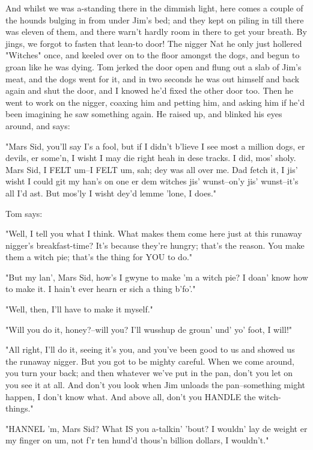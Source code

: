 And whilst we was a-standing there in the dimmish light, here comes a
couple of the hounds bulging in from under Jim's bed; and they kept on
piling in till there was eleven of them, and there warn't hardly room in
there to get your breath.  By jings, we forgot to fasten that lean-to
door!  The nigger Nat he only just hollered "Witches" once, and keeled
over on to the floor amongst the dogs, and begun to groan like he was
dying.  Tom jerked the door open and flung out a slab of Jim's meat, and
the dogs went for it, and in two seconds he was out himself and back
again and shut the door, and I knowed he'd fixed the other door too.
Then he went to work on the nigger, coaxing him and petting him, and
asking him if he'd been imagining he saw something again.  He raised up,
and blinked his eyes around, and says:

"Mars Sid, you'll say I's a fool, but if I didn't b'lieve I see most a
million dogs, er devils, er some'n, I wisht I may die right heah in dese
tracks.  I did, mos' sholy.  Mars Sid, I FELT um--I FELT um, sah; dey was
all over me.  Dad fetch it, I jis' wisht I could git my han's on one er
dem witches jis' wunst--on'y jis' wunst--it's all I'd ast.  But mos'ly I
wisht dey'd lemme 'lone, I does."

Tom says:

"Well, I tell you what I think.  What makes them come here just at this
runaway nigger's breakfast-time?  It's because they're hungry; that's the
reason.  You make them a witch pie; that's the thing for YOU to do."

"But my lan', Mars Sid, how's I gwyne to make 'm a witch pie?  I doan'
know how to make it.  I hain't ever hearn er sich a thing b'fo'."

"Well, then, I'll have to make it myself."

"Will you do it, honey?--will you?  I'll wusshup de groun' und' yo' foot,
I will!"

"All right, I'll do it, seeing it's you, and you've been good to us and
showed us the runaway nigger.  But you got to be mighty careful.  When we
come around, you turn your back; and then whatever we've put in the pan,
don't you let on you see it at all.  And don't you look when Jim unloads
the pan--something might happen, I don't know what.  And above all, don't
you HANDLE the witch-things."

"HANNEL 'm, Mars Sid?  What IS you a-talkin' 'bout?  I wouldn' lay de
weight er my finger on um, not f'r ten hund'd thous'n billion dollars, I
wouldn't."




